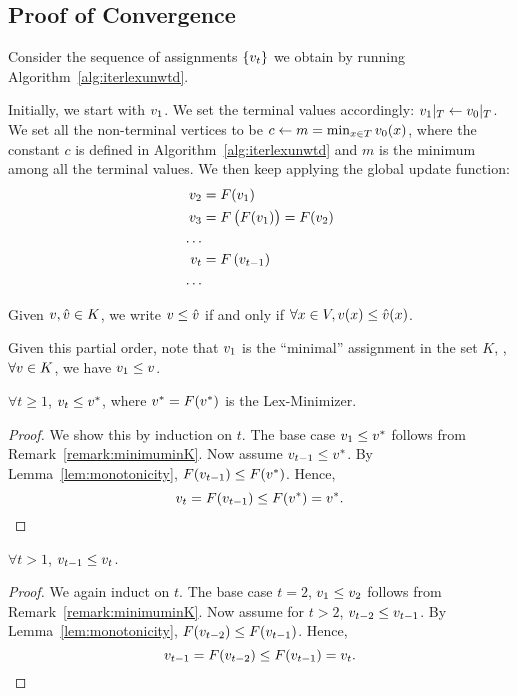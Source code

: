 \documentclass[12pt]{amsart}
\begin{document}
\subsection{Proof of Convergence}
Consider the sequence of assignments $\left\{v_t\right\}$ we obtain by running Algorithm~\ref{alg:iterlexunwtd}.

Initially, we start with $v_1$. We set the terminal values accordingly: $v_1|_T \gets v_0|_T$. We set all the non-terminal vertices to be $c \gets m = \min_{x\in T}v_0(x)$, where the constant $c$ is defined in Algorithm~\ref{alg:iterlexunwtd} and $m$ is the minimum among all the terminal values. We then keep applying the global update function:
\begin{align*}
v_2 &= F(v_1) \\
v_3 &= F\left({F(v_1)}\right) = F(v_2) \\
\hdots \\
v_t &= F\left({v_{t-1}}\right) \\
\hdots \\
\end{align*}

\begin{definition}
Given $v,\hat{v}\in K$, we write $v\leq \hat{v}$ if and only if 
$\forall x\in V, v(x)\leq \hat{v}(x)$.
\end{definition}

\begin{remark}\label{remark:minimuminK}
Given this partial order, note that $v_1$ is the ``minimal'' assignment in the set $K$, \ie, $\forall v\in K$, we have $v_1\leq v$.
\end{remark}

\begin{lemma}\label{lem:bounded}
$\forall t\geq 1$, $v_t\leq v^*$, where $v^*=F(v^*)$ is the Lex-Minimizer.
\end{lemma}
\begin{proof}
We show this by induction on $t$. The base case $v_1\leq v^*$ follows from Remark~\ref{remark:minimuminK}. Now assume $v_{t-1}\leq v^*$. By Lemma~\ref{lem:monotonicity}, $F(v_{t-1}) \leq F(v^*)$. Hence, $$v_t = F(v_{t-1}) \leq F(v^*) = v^*. $$
\end{proof}

\begin{lemma}\label{lem:monotoneseq}
$\forall t > 1$, $v_{t-1}\leq v_{t}$.
\end{lemma}
\begin{proof}
We again induct on $t$. The base case $t=2$, $v_1\leq v_2$ follows from Remark~\ref{remark:minimuminK}. Now assume for $t>2$, $v_{t-2}\leq v_{t-1}$. By Lemma~\ref{lem:monotonicity}, $F(v_{t-2}) \leq F(v_{t-1})$. Hence,
$$ v_{t-1} = F(v_{t-2}) \leq F(v_{t-1}) = v_{t}.$$
\end{proof}
\end{document}
